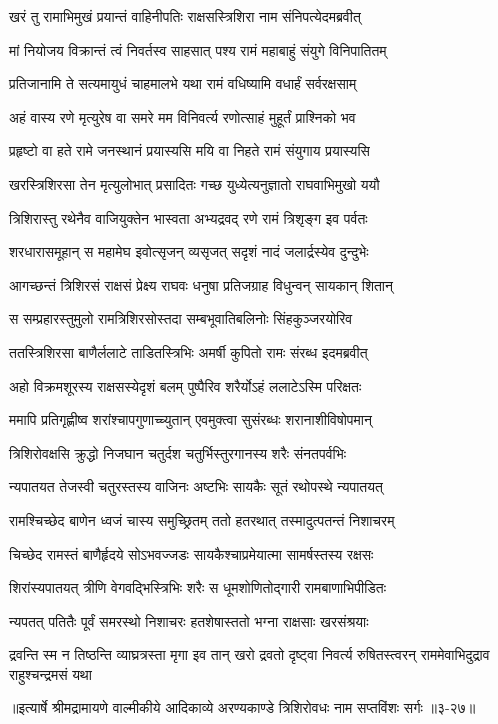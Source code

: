
\twolineshloka
{खरं तु रामाभिमुखं प्रयान्तं वाहिनीपतिः}
{राक्षसस्त्रिशिरा नाम संनिपत्येदमब्रवीत्} %

\twolineshloka
{मां नियोजय विक्रान्तं त्वं निवर्तस्व साहसात्}
{पश्य रामं महाबाहुं संयुगे विनिपातितम्} %

\twolineshloka
{प्रतिजानामि ते सत्यमायुधं चाहमालभे}
{यथा रामं वधिष्यामि वधार्हं सर्वरक्षसाम्} %

\twolineshloka
{अहं वास्य रणे मृत्युरेष वा समरे मम}
{विनिवर्त्य रणोत्साहं मुहूर्तं प्राश्निको भव} %

\twolineshloka
{प्रहृष्टो वा हते रामे जनस्थानं प्रयास्यसि}
{मयि वा निहते रामं संयुगाय प्रयास्यसि} %

\twolineshloka
{खरस्त्रिशिरसा तेन मृत्युलोभात् प्रसादितः}
{गच्छ युध्येत्यनुज्ञातो राघवाभिमुखो ययौ} %

\twolineshloka
{त्रिशिरास्तु रथेनैव वाजियुक्तेन भास्वता}
{अभ्यद्रवद् रणे रामं त्रिशृङ्ग इव पर्वतः} %

\twolineshloka
{शरधारासमूहान् स महामेघ इवोत्सृजन्}
{व्यसृजत् सदृशं नादं जलार्द्रस्येव दुन्दुभेः} %

\twolineshloka
{आगच्छन्तं त्रिशिरसं राक्षसं प्रेक्ष्य राघवः}
{धनुषा प्रतिजग्राह विधुन्वन् सायकान् शितान्} %

\twolineshloka
{स सम्प्रहारस्तुमुलो रामत्रिशिरसोस्तदा}
{सम्बभूवातिबलिनोः सिंहकुञ्जरयोरिव} %

\twolineshloka
{ततस्त्रिशिरसा बाणैर्ललाटे ताडितस्त्रिभिः}
{अमर्षी कुपितो रामः संरब्ध इदमब्रवीत्} %

\twolineshloka
{अहो विक्रमशूरस्य राक्षसस्येदृशं बलम्}
{पुष्पैरिव शरैर्योऽहं ललाटेऽस्मि परिक्षतः} %

\twolineshloka
{ममापि प्रतिगृह्णीष्व शरांश्चापगुणाच्च्युतान्}
{एवमुक्त्वा सुसंरब्धः शरानाशीविषोपमान्} %

\twolineshloka
{त्रिशिरोवक्षसि क्रुद्धो निजघान चतुर्दश}
{चतुर्भिस्तुरगानस्य शरैः संनतपर्वभिः} %

\twolineshloka
{न्यपातयत तेजस्वी चतुरस्तस्य वाजिनः}
{अष्टभिः सायकैः सूतं रथोपस्थे न्यपातयत्} %

\twolineshloka
{रामश्चिच्छेद बाणेन ध्वजं चास्य समुच्छ्रितम्}
{ततो हतरथात् तस्मादुत्पतन्तं निशाचरम्} %

\twolineshloka
{चिच्छेद रामस्तं बाणैर्हृदये सोऽभवज्जडः}
{सायकैश्चाप्रमेयात्मा सामर्षस्तस्य रक्षसः} %

\twolineshloka
{शिरांस्यपातयत् त्रीणि वेगवद्भिस्त्रिभिः शरैः}
{स धूमशोणितोद्गारी रामबाणाभिपीडितः} %

\twolineshloka
{न्यपतत् पतितैः पूर्वं समरस्थो निशाचरः}
{हतशेषास्ततो भग्ना राक्षसाः खरसंश्रयाः} %

\threelineshloka
{द्रवन्ति स्म न तिष्ठन्ति व्याघ्रत्रस्ता मृगा इव}
{तान् खरो द्रवतो दृष्ट्वा निवर्त्य रुषितस्त्वरन्}
{राममेवाभिदुद्राव राहुश्चन्द्रमसं यथा} %


॥इत्यार्षे श्रीमद्रामायणे वाल्मीकीये आदिकाव्ये अरण्यकाण्डे त्रिशिरोवधः नाम सप्तविंशः सर्गः ॥३-२७॥
